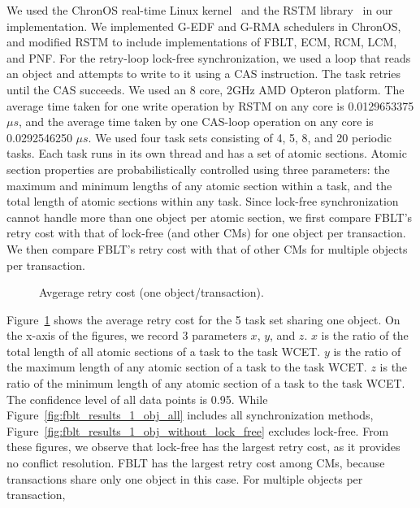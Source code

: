 \documentclass[conference]{IEEEtran}
\begin{document}
We used the ChronOS real-time Linux kernel~\cite{dellinger2011chronos}
and the RSTM library~\cite{marathe2006lowering} in our implementation. We implemented G-EDF and G-RMA schedulers in ChronOS, and modified RSTM to include implementations of FBLT, ECM, RCM, LCM, and PNF. For the retry-loop lock-free synchronization, we used a loop that reads an object and attempts to write to it using a CAS  instruction. The task retries until the CAS succeeds. We used an 8 core, 2GHz AMD Opteron platform. The average time taken for one write operation by RSTM on any core is 0.0129653375$\mu s$, and the average time taken by one CAS-loop operation on any core is 0.0292546250 $\mu s$. We used four task sets consisting of 4, 5, 8, and 20 periodic tasks. Each task runs in its own thread and has a set of atomic sections. Atomic section properties are probabilistically controlled using three parameters: the maximum and minimum lengths of any atomic section within a task, and the total length of atomic sections within any task. Since lock-free synchronization cannot handle more than one object per atomic section, we first compare FBLT's retry cost with that of lock-free (and other CMs) for one object per transaction. We then compare FBLT's retry cost with that of other CMs for multiple objects per transaction.
%
\begin{figure}
\centering
{}
\caption{Avgerage retry cost (one object/transaction).}

\label{fig:fblt_results_uniobject}
\end{figure}
%
Figure~\ref{fig:fblt_results_uniobject} shows the average retry cost for the 5 task set sharing one object. On the x-axis of the figures, we record 3 parameters $x$, $y$, and $z$. $x$ is the ratio of the total length of all atomic sections of a task to the task WCET. $y$ is the ratio of the maximum length of any atomic section of a task to the task WCET. $z$ is the ratio of the minimum length of any atomic section of a task to the task WCET. The confidence level of all data points is 0.95. While Figure~\ref{fig:fblt_results_1_obj_all} includes all synchronization methods, Figure~\ref{fig:fblt_results_1_obj_without_lock_free} excludes lock-free. From these figures, we observe that lock-free has the largest retry cost, as it provides no conflict resolution. FBLT has the largest retry cost among CMs,  because transactions share only one object in this case. For multiple objects per transaction, 
\end{document}
